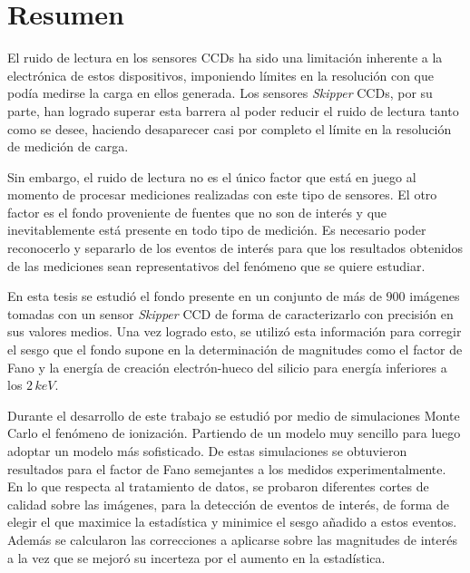 \newpage
\chapter*{Resumen}
\thispagestyle{empty}
\noindent El ruido de lectura en los sensores CCDs ha sido una limitación inherente a la electrónica de estos dispositivos, imponiendo límites en la resolución con que podía medirse la carga en ellos generada. Los sensores \textit{Skipper} CCDs, por su parte, han logrado superar esta barrera %
al poder reducir el ruido de lectura tanto como se desee, haciendo desaparecer casi por completo el límite en la resolución de medición de carga.

Sin embargo, el ruido de lectura no es el único factor que está en juego al momento de procesar mediciones realizadas con este tipo de sensores. El otro factor es el fondo proveniente de fuentes que no son de interés y que inevitablemente está presente en todo tipo de medición. Es necesario poder reconocerlo y separarlo de los eventos de interés para que los resultados obtenidos de las mediciones sean representativos del fenómeno que se quiere estudiar.

En esta tesis se estudió el fondo presente en un conjunto de más de $900$ imágenes tomadas con un sensor \textit{Skipper} CCD de forma de caracterizarlo con precisión en sus valores medios. %
Una vez logrado esto, se utilizó esta información para corregir el sesgo que el fondo supone en la determinación de magnitudes como el factor de Fano y la energía de creación electrón-hueco del silicio para energía inferiores a los $2\,\si{keV}$.

Durante el desarrollo de este trabajo se estudió por medio de simulaciones Monte Carlo el fenómeno de ionización. Partiendo de un modelo muy sencillo para luego adoptar un modelo más sofisticado. De estas simulaciones se obtuvieron resultados para el factor de Fano semejantes a los medidos experimentalmente. En lo que respecta al tratamiento de datos, se probaron diferentes cortes de calidad sobre las imágenes, para la detección de eventos de interés, de forma de elegir el que maximice la estadística y minimice el sesgo añadido a estos eventos. Además se calcularon las correcciones a aplicarse sobre las magnitudes de interés %
a la vez que se mejoró su incerteza por el aumento en la estadística.

